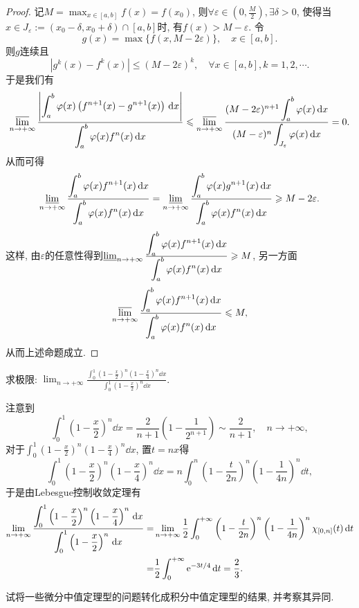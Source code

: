 \begin{quizb}
\begin{proof}
记\(M=\max_{x\in[a,b]}f(x)=f(x_0)\), 则\(\forall\varepsilon\in\left(0,\frac{M}{2}\right),\exists\delta>0\), 使得当\(x\in J_\varepsilon:=(x_0-\delta,x_0+\delta)\cap[a,b]\)时, 有\(f(x)>M-\varepsilon\). 令\[g(x)=\max\{f(x,M-2\varepsilon)\},\quad x\in[a,b].\]则\(g\)连续且\[|g^k(x)-f^k(x)|\leqslant (M-2\varepsilon)^k,\quad\forall x\in[a,b],k=1,2,\cdots.\]
于是我们有\[\varlimsup_{n\rightarrow+\infty}\frac{\left|\displaystyle\int_{a}^{b}\varphi(x)\left(f^{n+1}(x)-g^{n+1}(x)\right)\,\mathrm{d} x\right|}{\displaystyle\int_{a}^{b}\varphi(x)f^n(x)\,\mathrm{d} x}\leqslant\varlimsup_{n\rightarrow+\infty}\frac{(M-2\varepsilon)^{n+1}\displaystyle\int_{a}^{b}\varphi(x)\,\mathrm{d} x}{(M-\varepsilon)^n\displaystyle\int_{J_{\varepsilon}}\varphi(x)\,\mathrm{d} x}=0.\]
从而可得\[\varliminf_{n\rightarrow+\infty}\frac{\displaystyle\int_{a}^{b}\varphi(x)f^{n+1}(x)\,\mathrm{d} x}{\displaystyle\int_{a}^{b}\varphi(x)f^n(x)\,\mathrm{d} x}=\varliminf_{n\rightarrow+\infty}\frac{\displaystyle\int_{a}^{b}\varphi(x)g^{n+1}(x)\,\mathrm{d} x}{\displaystyle\int_{a}^{b}\varphi(x)f^n(x)\,\mathrm{d} x}\geqslant M-2\varepsilon.\]
这样, 由\(\varepsilon\)的任意性得到\(\varliminf_{n\rightarrow+\infty}\frac{\displaystyle\int_{a}^{b}\varphi(x)f^{n+1}(x)\,\mathrm{d} x}{\displaystyle\int_{a}^{b}\varphi(x)f^n(x)\,\mathrm{d} x}\geqslant M\), 另一方面\[\varlimsup_{n\rightarrow+\infty}\frac{\displaystyle\int_{a}^{b}\varphi(x)f^{n+1}(x)\,\mathrm{d} x}{\displaystyle\int_{a}^{b}\varphi(x)f^n(x)\,\mathrm{d} x}\leqslant M,\]从而上述命题成立.
\end{proof}
\woe 求极限: \(\lim_{n\rightarrow+\infty}\frac{\displaystyle\int_{0}^{1}\left(1-\frac{x}{2}\right)^n\left(1-\frac{x}{4}\right)^n\dd x}{\displaystyle\int_{0}^{1}\left(1-\frac{x}{2}\right)^n\dd x}\).
\begin{solution}
注意到\[\int_{0}^{1}\left(1-\frac{x}{2}\right)^n\dd x=\frac{2}{n+1}\left(1-\frac{1}{2^{n+1}}\right)\sim\frac{2}{n+1},\quad n\rightarrow+\infty,\]
对于\(\int_{0}^{1}\left(1-\frac{x}{2}\right)^n\left(1-\frac{x}{4}\right)^n\dd x\), 置\(t=nx\)得\[\int_{0}^{1}\left(1-\frac{x}{2}\right)^n\left(1-\frac{x}{4}\right)^n\dd x=n\int_{0}^{n}\left(1-\frac{t}{2n}\right)^n\left(1-\frac{1}{4n}\right)^n\dd t,\]
于是由Lebesgue控制收敛定理有\[\begin{split}
\lim_{n\rightarrow+\infty}\frac{\displaystyle\int_{0}^{1}\left(1-\frac{x}{2}\right)^n\left(1-\frac{x}{4}\right)^n\,\mathrm{d} x}{\displaystyle\int_{0}^{1}\left(1-\frac{x}{2}\right)^n\,\mathrm{d} x}=&\lim_{n\rightarrow+\infty}\frac{1}{2}\int_{0}^{+\infty}\left(1-\frac{t}{2n}\right)^n\left(1-\frac{1}{4n}\right)^n\chi_{[0,n]}(t)\,\mathrm{d} t\\=&\frac{1}{2}\int_{0}^{+\infty}\mathrm{e}^{-3t/4}\,\mathrm{d} t=\frac{2}{3}.\qedhere
\end{split}\]
\end{solution}
\woe 试将一些微分中值定理型的问题转化成积分中值定理型的结果, 并考察其异同.
\end{quizb}
